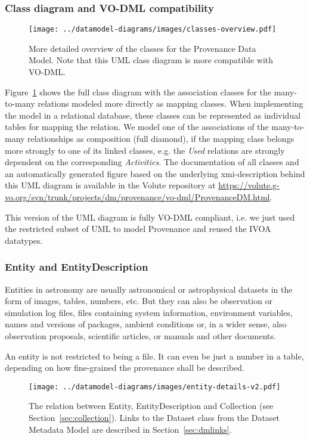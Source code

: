 \subsubsection{Class diagram and VO-DML compatibility}
\begin{figure}[h]
\centering
\texttt{[image: ../datamodel-diagrams/images/classes-overview.pdf]}
\caption{More detailed overview of the classes for the Provenance Data Model. Note that this UML class diagram is more compatible with VO-DML.}
\label{fig:classdiagram}
\end{figure}

Figure~\ref{fig:classdiagram} shows the full class diagram with the association classes for the many-to-many relations modeled more directly as mapping classes. When implementing the model in a relational database, these classes can be represented as individual tables for mapping the relation. We model one of the associations of the many-to-many relationships as composition (full diamond), if the mapping class belongs more strongly to one of its linked classes, e.g. the \emph{Used} relations are strongly dependent on the corresponding \emph{Activities}. The documentation of all classes and an automatically generated figure based on the underlying xmi-description behind this UML diagram is available in the Volute repository at
\url{https://volute.g-vo.org/svn/trunk/projects/dm/provenance/vo-dml/ProvenanceDM.html}.

This version of the UML diagram is fully VO-DML compliant, i.e. we just used the restricted subset of UML to model
Provenance and reused the IVOA datatypes.


\subsubsection{Entity and EntityDescription}

Entities in astronomy are usually astronomical or astrophysical datasets in the 
form of images, tables, numbers, etc. But they can also be observation or 
simulation log files, files containing system information, environment variables, names and versions of packages, ambient conditions or, in a wider sense, also observation proposals, scientific 
articles, or manuals and other documents. 

An entity is not restricted to being a file. 
It can even be just a number in a table, depending on how fine-grained the 
provenance shall be described.

\begin{figure}[h]
\centering
\texttt{[image: ../datamodel-diagrams/images/entity-details-v2.pdf]}
\caption{The relation between Entity, EntityDescription and Collection (see Section~\ref{sec:collection}). 
Links to the Dataset class from the Dataset Metadata Model are described in Section~\ref{sec:dmlinks}.}
\label{fig:entity-details}
\end{figure}

